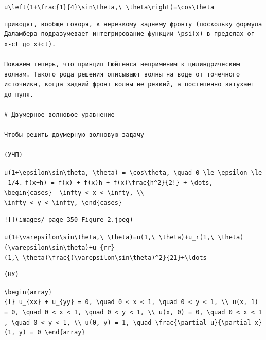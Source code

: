 \documentclass[
  ukrainian,
]{article}
\begin{document}
\texttt{u\textbackslash{}left(1+\textbackslash{}frac\{1\}\{4\}\textbackslash{}sin\textbackslash{}theta,\textbackslash{}\ \textbackslash{}theta\textbackslash{}right)=\textbackslash{}cos\textbackslash{}theta}

\begin{verbatim}
приводят, вообще говоря, к нерезкому заднему фронту (поскольку формула Даламбера подразумевает интегрирование функции \psi(x) в пределах от x-ct до x+ct).

Покажем теперь, что принцип Гюйгенса неприменим к цилиндрическим волнам. Такого рода решения описывают волны на воде от точечного источника, когда задний фронт волны не резкий, а постепенно затухает до нуля.

# Двумерное волновое уравнение

Чтобы решить двумерную волновую задачу

(УЧП)
\end{verbatim}

\texttt{u(1+\textbackslash{}epsilon\textbackslash{}sin\textbackslash{}theta,\ \textbackslash{}theta)\ =\ \textbackslash{}cos\textbackslash{}theta,\ \textbackslash{}quad\ 0\ \textbackslash{}le\ \textbackslash{}epsilon\ \textbackslash{}le\ 1/4.}
\texttt{f(x+h)\ =\ f(x)\ +\ f\textquotesingle{}(x)h\ +\ f\textquotesingle{}\textquotesingle{}(x)\textbackslash{}frac\{h\^{}2\}\{2!\}\ +\ \textbackslash{}dots,}
\texttt{\textbackslash{}begin\{cases\}\ -\textbackslash{}infty\ \textless{}\ x\ \textless{}\ \textbackslash{}infty,\ \textbackslash{}\textbackslash{}\ -\textbackslash{}infty\ \textless{}\ y\ \textless{}\ \textbackslash{}infty,\ \textbackslash{}end\{cases\}}

\begin{verbatim}
![](images/_page_350_Figure_2.jpeg)
\end{verbatim}

\texttt{u(1+\textbackslash{}varepsilon\textbackslash{}sin\textbackslash{}theta,\textbackslash{}\ \textbackslash{}theta)=u(1,\textbackslash{}\ \textbackslash{}theta)+u\_r(1,\textbackslash{}\ \textbackslash{}theta)(\textbackslash{}varepsilon\textbackslash{}sin\textbackslash{}theta)+u\_\{rr\}(1,\textbackslash{}\ \textbackslash{}theta)\textbackslash{}frac\{(\textbackslash{}varepsilon\textbackslash{}sin\textbackslash{}theta)\^{}2\}\{21\}+\textbackslash{}ldots}

\begin{verbatim}
(НУ)
\end{verbatim}

\texttt{\textbackslash{}begin\{array\}\{l\}\ u\_\{xx\}\ +\ u\_\{yy\}\ =\ 0,\ \textbackslash{}quad\ 0\ \textless{}\ x\ \textless{}\ 1,\ \textbackslash{}quad\ 0\ \textless{}\ y\ \textless{}\ 1,\ \textbackslash{}\textbackslash{}\ u(x,\ 1)\ =\ 0,\ \textbackslash{}quad\ 0\ \textless{}\ x\ \textless{}\ 1,\ \textbackslash{}quad\ 0\ \textless{}\ y\ \textless{}\ 1,\ \textbackslash{}\textbackslash{}\ u(x,\ 0)\ =\ 0,\ \textbackslash{}quad\ 0\ \textless{}\ x\ \textless{}\ 1,\ \textbackslash{}quad\ 0\ \textless{}\ y\ \textless{}\ 1,\ \textbackslash{}\textbackslash{}\ u(0,\ y)\ =\ 1,\ \textbackslash{}quad\ \textbackslash{}frac\{\textbackslash{}partial\ u\}\{\textbackslash{}partial\ x\}(1,\ y)\ =\ 0\ \textbackslash{}end\{array\}}
\end{document}
